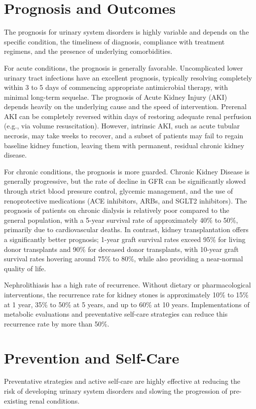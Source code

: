\section*{Prognosis and Outcomes}
The prognosis for urinary system disorders is highly variable and depends on the specific condition, the timeliness of diagnosis, compliance with treatment regimens, and the presence of underlying comorbidities.

For acute conditions, the prognosis is generally favorable. Uncomplicated lower urinary tract infections have an excellent prognosis, typically resolving completely within 3 to 5 days of commencing appropriate antimicrobial therapy, with minimal long-term sequelae. The prognosis of Acute Kidney Injury (AKI) depends heavily on the underlying cause and the speed of intervention. Prerenal AKI can be completely reversed within days of restoring adequate renal perfusion (e.g., via volume resuscitation). However, intrinsic AKI, such as acute tubular necrosis, may take weeks to recover, and a subset of patients may fail to regain baseline kidney function, leaving them with permanent, residual chronic kidney disease.

For chronic conditions, the prognosis is more guarded. Chronic Kidney Disease is generally progressive, but the rate of decline in GFR can be significantly slowed through strict blood pressure control, glycemic management, and the use of renoprotective medications (ACE inhibitors, ARBs, and SGLT2 inhibitors). The prognosis of patients on chronic dialysis is relatively poor compared to the general population, with a 5-year survival rate of approximately 40\% to 50\%, primarily due to cardiovascular deaths. In contrast, kidney transplantation offers a significantly better prognosis; 1-year graft survival rates exceed 95\% for living donor transplants and 90\% for deceased donor transplants, with 10-year graft survival rates hovering around 75\% to 80\%, while also providing a near-normal quality of life.

Nephrolithiasis has a high rate of recurrence. Without dietary or pharmacological interventions, the recurrence rate for kidney stones is approximately 10\% to 15\% at 1 year, 35\% to 50\% at 5 years, and up to 60\% at 10 years. Implementations of metabolic evaluations and preventative self-care strategies can reduce this recurrence rate by more than 50\%.

\section*{Prevention and Self-Care}
Preventative strategies and active self-care are highly effective at reducing the risk of developing urinary system disorders and slowing the progression of pre-existing renal conditions.

